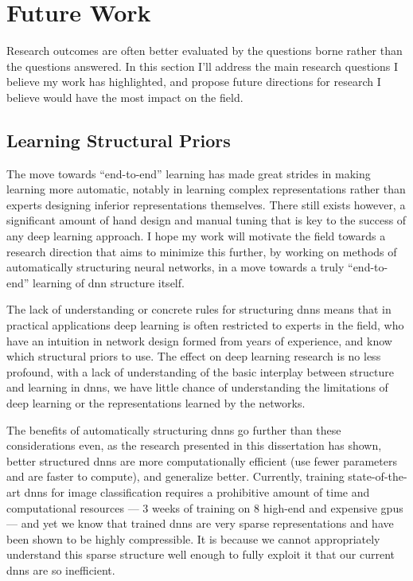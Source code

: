 \documentclass[thesis]{subfiles}
\begin{document}

\chapter{Future Work}  %
\label{futurework}


Research outcomes are often better evaluated by the questions borne rather than the questions answered. In this section I'll address the main research questions I believe my work has highlighted, and propose future directions for research I believe would have the most impact on the field.

\section{Learning Structural Priors}
The move towards ``end-to-end'' learning has made great strides in making learning more automatic, notably in learning complex representations rather than experts designing inferior representations themselves. There still exists however, a significant amount of hand design and manual tuning that is key to the success of any deep learning approach. I hope my work will motivate the field towards a research direction that aims to minimize this further, by working on methods of automatically structuring neural networks, in a move towards a truly ``end-to-end'' learning of \gls{dnn} structure itself.

The lack of understanding or concrete rules for structuring \glspl{dnn} means that in practical applications deep learning is often restricted to experts in the field, who have an intuition in network design formed from years of experience, and know which structural priors to use. The effect on deep learning research is no less profound, with a lack of understanding of the basic interplay between structure and learning in \glspl{dnn}, we have little chance of understanding the limitations of deep learning or the representations learned by the networks. 

The benefits of automatically structuring \glspl{dnn} go further than these considerations even, as the research presented in this dissertation has shown, better structured \glspl{dnn} are more computationally efficient (use fewer parameters and are faster to compute), and generalize better. Currently, training state-of-the-art \glspl{dnn} for image classification requires a prohibitive amount of time and computational resources --- 3 weeks of training on 8 high-end and expensive \glspl{gpu} --- and yet we know that trained \glspl{dnn} are very sparse representations and have been shown to be highly compressible. It is because we cannot appropriately understand this sparse structure well enough to fully exploit it that our current \glspl{dnn} are so inefficient.
\end{document}
